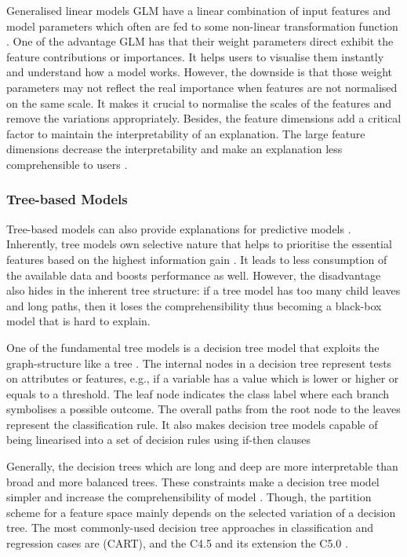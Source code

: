\documentclass[english]{tktltiki2}
\theoremstyle{definition}
\theoremstyle{remark}
\begin{document}
Generalised linear models GLM have a linear combination of input features and model parameters which often are fed to some non-linear transformation function \citep{murdoch2019interpretable}. One of the advantage GLM has that their weight parameters direct exhibit the feature contributions or importances. It helps users to visualise them instantly and understand how a model works. However, the downside is that those weight parameters may not reflect the real importance when features are not normalised on the same scale. It makes it crucial to normalise the scales of the features and remove the variations appropriately. Besides, the feature dimensions add a critical factor to maintain the interpretability of an explanation. The large feature dimensions decrease the interpretability and make an explanation less comprehensible to users \citep{molnarinterpretable,miller2018explanation, murdoch2019interpretable}.

\subsubsection{Tree-based Models}
Tree-based models can also provide explanations for predictive models \citep{guidotti2018survey,molnarinterpretable,murdoch2019interpretable}. Inherently, tree models own selective nature that helps to prioritise the essential features based on the highest information gain \citep{hastie09elementsofstatisticallearning}. It leads to less consumption of the available data and boosts performance as well. However, the disadvantage also hides in the inherent tree structure: if a tree model has too many child leaves and long paths, then it loses the comprehensibility thus becoming a black-box model that is hard to explain.

One of the fundamental tree models is a decision tree model that exploits the graph-structure like a tree \citep{guidotti2018survey, molnarinterpretable}. The internal nodes in a decision tree represent tests on attributes or features, e.g., if a variable has a value which is lower or higher or equals to a threshold. The leaf node indicates the class label where each branch symbolises a possible outcome. The overall paths from the root node to the leaves represent the classification rule. It also makes decision tree models capable of being linearised into a set of decision rules using if-then clauses 


Generally, the decision trees which are long and deep are more interpretable than broad and more balanced trees. These constraints make a decision tree model simpler and increase the comprehensibility of model \citep{guidotti2018survey, murdoch2019interpretable}. Though, the partition scheme for a feature space mainly depends on the selected variation of a decision tree. The most commonly-used decision tree approaches in classification and regression cases are (CART), and the C4.5 and its extension the C5.0 \citep{hastie09elementsofstatisticallearning, molnarinterpretable}.
\end{document}
